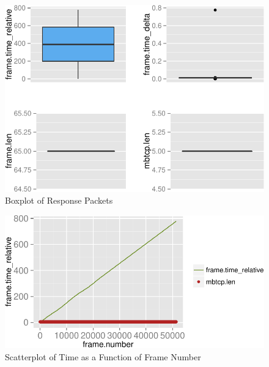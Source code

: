 \documentclass[12pt,]{article}
\begin{document}
\begin{figure}

{\centering \includegraphics{thesis_files/figure-latex/unnamed-chunk-23-1} 

}

\caption{Boxplot of Response Packets}\label{fig:unnamed-chunk-23}
\end{figure}

\clearpage

\begin{figure}

{\centering \includegraphics{thesis_files/figure-latex/unnamed-chunk-24-1} 

}

\caption{Scatterplot of Time as a Function of Frame Number}\label{fig:unnamed-chunk-24}
\end{figure}
\end{document}
